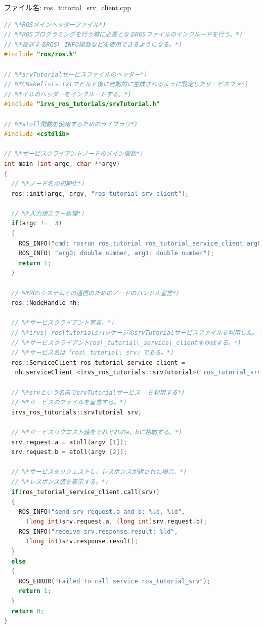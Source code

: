 ファイル名: ros\_tutorial\_srv\_client.cpp
\begin{lstlisting}[language=C++]
// %*ROSメインヘッダーファイル*)
// %*ROSプログラミングを行う際に必要となるROSファイルのインクルードを行う。*)
// %*後述するROS\_INFO関数などを使用できるようになる。*)
#include "ros/ros.h"

// %*srvTutorialサービスファイルのヘッダー*)
// %*CMakelists.txtでビルド後に自動的に生成されるように設定したサービスファ*)
// %*イルのヘッダーをインクルードする。*)
#include "irvs_ros_tutorials/srvTutorial.h"

// %*atoll関数を使用するためのライブラリ*)
#include <cstdlib>

// %*サービスクライアントノードのメイン関数*)
int main (int argc, char **argv)
{
  // %*ノード名の初期化*)
  ros::init(argc, argv, "ros_tutorial_srv_client");

  // %*入力値エラー処理*)
  if(argc !=  3)
  {
    ROS_INFO("cmd: rosrun ros_tutorial ros_tutorial_service_client arg0 arg1");
    ROS_INFO( "arg0: double number, arg1: double number");
    return 1;
  }

  // %*ROSシステムとの通信のためのノードのハンドル宣言*)
  ros::NodeHandle nh;

  // %*サービスクライアント宣言、*)
  // %*irvs\_ros\tutorialsパッケージのsrvTutorialサービスファイルを利用した。*)
  // %*サービスクライアントros\_tutorial\_service\_clientを作成する。*)
  // %*サービス名は「ros\_tutorial\_srv」である。*)
  ros::ServiceClient ros_tutorial_service_client =
   nh.serviceClient <irvs_ros_tutorials::srvTutorial>("ros_tutorial_srv");

  // %*srvという名前でsrvTutorialサービス  を利用する*)
  // %*サービスのファイルを宣言する。*)
  irvs_ros_tutorials::srvTutorial srv;

  // %*サービスリクエスト値をそれぞれのa、bに格納する。*)
  srv.request.a = atoll(argv [1]);
  srv.request.b = atoll(argv [2]);

  // %*サービスをリクエストし、レスポンスが返された場合、*)
  // %*レスポンス値を表示する。*)
  if(ros_tutorial_service_client.call(srv))
  {
    ROS_INFO("send srv request.a and b: %ld, %ld",
      (long int)srv.request.a, (long int)srv.request.b);
    ROS_INFO("receive srv.response.result: %ld",
      (long int)srv.response.result);
  }
  else
  {
    ROS_ERROR("Failed to call service ros_tutorial_srv");
    return 1;
  }
  return 0;
}
\end{lstlisting}

